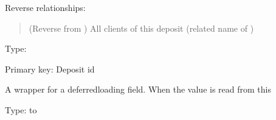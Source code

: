 \documentclass[letterpaper,10pt,russian]{sphinxmanual}
\begin{document}
\begin{fulllineitems}
\begin{quote}
\begin{description}
\end{description}\end{quote}

\sphinxAtStartPar
Reverse relationships:
\begin{quote}\begin{description}
\sphinxAtStartPar
{} (Reverse  from {\hyperref[\detokenize{myapp:polls.models.Client}]{}}) \textendash{} All clients of this deposit (related name of {\hyperref[\detokenize{myapp:polls.models.Client.deposit}]{}})

\end{description}\end{quote}

\begin{fulllineitems}
\label{\detokenize{myapp:polls.models.Deposit.deposit_id}}
\pysigstartsignatures
\pysigline
{}
\pysigstopsignatures
\sphinxAtStartPar
Type: 

\sphinxAtStartPar
Primary key: Deposit id

\sphinxAtStartPar
A wrapper for a deferred\sphinxhyphen{}loading field. When the value is read from this

\end{fulllineitems}


\begin{fulllineitems}
\label{\detokenize{myapp:polls.models.Deposit.client_id1}}
\pysigstartsignatures
\pysigline
{}
\pysigstopsignatures
\sphinxAtStartPar
Type:  to {\hyperref[\detokenize{myapp:polls.models.Client}]{}}


\end{fulllineitems}
\end{fulllineitems}
\end{document}
